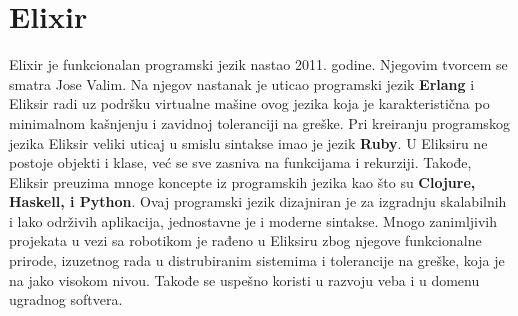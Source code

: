 \documentclass[12pt,oneside]{memoir}
\begin{document}
\frontmatter
\naslovna
\komisija
\apstrakt
\tableofcontents*

\mainmatter

\chapter{Elixir} %

Elixir je funkcionalan programski jezik nastao 2011. godine. Njegovim tvorcem se smatra Jose Valim. Na njegov nastanak je uticao programski jezik \textbf{Erlang} i Eliksir radi uz podršku virtualne mašine ovog jezika koja je karakteristična po minimalnom kašnjenju i zavidnoj toleranciji na greške. Pri kreiranju programskog jezika Eliksir veliki uticaj u smislu sintakse imao je jezik \textbf{Ruby}. U Eliksiru ne postoje objekti i klase, već se sve zasniva na funkcijama i rekurziji. Takođe, Eliksir preuzima mnoge koncepte iz programskih jezika kao što su \textbf{Clojure, Haskell, i Python}. Ovaj programski jezik dizajniran je za izgradnju skalabilnih i lako održivih aplikacija, jednostavne je i moderne sintakse. Mnogo zanimljivih projekata u vezi sa robotikom je rađeno u Eliksiru zbog njegove funkcionalne prirode, izuzetnog rada u distrubiranim sistemima i tolerancije na greške, koja je na jako visokom nivou. Takođe se uspešno koristi u razvoju veba i u domenu ugradnog softvera.
\end{document}
